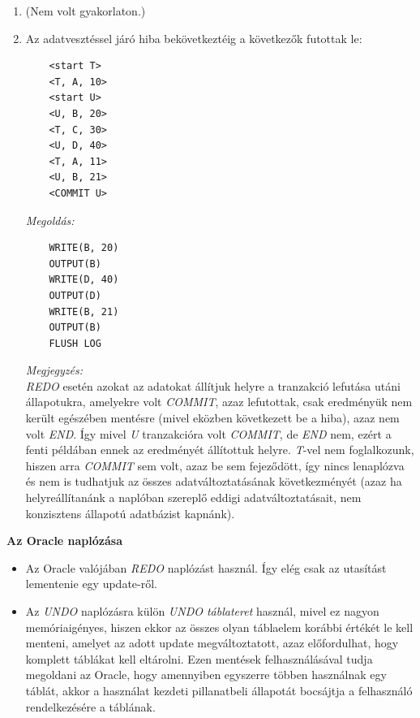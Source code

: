 \documentclass[a4paper,11.5pt, table]{article}
\begin{document}
\begin{itemize}
		\begin{enumerate}[label=\alph*)]
			\item (Nem volt gyakorlaton.)
			\item Az adatvesztéssel járó hiba bekövetkeztéig a következők futottak le:
			\begin{lstlisting}
	<start T> 
	<T, A, 10> 
	<start U> 
	<U, B, 20> 
	<T, C, 30> 
	<U, D, 40>
	<T, A, 11>
	<U, B, 21>  
	<COMMIT U>
			\end{lstlisting}
			\textit{Megoldás:}
			\begin{lstlisting}
	WRITE(B, 20)
	OUTPUT(B)
	WRITE(D, 40)
	OUTPUT(D)
	WRITE(B, 21)
	OUTPUT(B)
	FLUSH LOG
			\end{lstlisting}
			\textit{Megjegyzés:}\\
			\textit{REDO} esetén azokat az adatokat állítjuk helyre a tranzakció lefutása utáni állapotukra, amelyekre volt \textit{COMMIT}, azaz lefutottak, csak eredményük nem került egészében mentésre (mivel eközben következett be a hiba), azaz nem volt \textit{END}. Így mivel \textit{U} tranzakcióra volt \textit{COMMIT}, de \textit{END} nem, ezért a fenti példában ennek az eredményét állítottuk helyre. \textit{T}-vel nem foglalkozunk, hiszen arra \textit{COMMIT} sem volt, azaz be sem fejeződött, így nincs lenaplózva és nem is tudhatjuk az összes adatváltoztatásának következményét (azaz ha helyreállítanánk a naplóban szereplő eddigi adatváltoztatásait, nem konzisztens állapotú adatbázist kapnánk).
		\end{enumerate}
		
	\end{itemize}

	{\large \textbf{Az Oracle naplózása}}
	\begin{itemize}
		\item Az Oracle valójában \textit{REDO} naplózást használ. Így elég csak az utasítást lementenie egy update-ről.
		
		\item Az \textit{UNDO} naplózásra külön \textit{UNDO táblateret} használ, mivel ez nagyon memóriaigényes, hiszen ekkor az összes olyan táblaelem korábbi értékét le kell menteni, amelyet az adott update megváltoztatott, azaz előfordulhat, hogy komplett táblákat kell eltárolni. Ezen mentések felhasználásával tudja megoldani az Oracle, hogy amennyiben egyszerre többen használnak egy táblát, akkor a használat kezdeti pillanatbeli állapotát bocsájtja a felhasználó rendelkezésére a táblának.
	\end{itemize}
\end{document}
